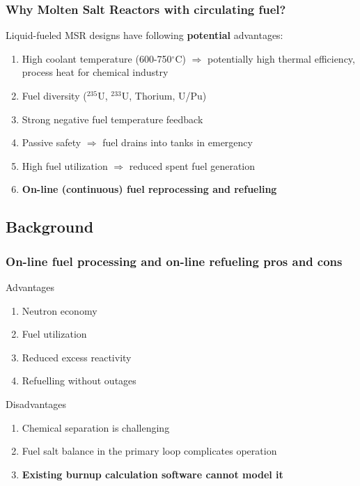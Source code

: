 \begin{frame}
\frametitle{Why Molten Salt Reactors with circulating fuel?}
\begin{block}{Liquid-fueled \gls{MSR} designs have following \textbf{potential} advantages:}
	\begin{enumerate}
		\itemsep1em
		\item High coolant temperature (600-750$^{\circ}$C) 
		$\Rightarrow$ potentially high thermal efficiency, process 
		heat for chemical industry
		\item Fuel diversity ($^{235}$U, $^{233}$U, Thorium, U/Pu)
		\item Strong negative fuel temperature feedback 
		\item Passive safety $\Rightarrow$ fuel drains into tanks 
		in emergency
		\item High fuel utilization $\Rightarrow$ reduced spent fuel 
		generation
		\item<2> \textbf{On-line (continuous) fuel reprocessing and refueling}
	\end{enumerate}
\end{block}

\end{frame}


\subsection{Background}


\begin{frame}
\frametitle{On-line fuel processing and on-line refueling pros and 
cons}
\begin{block}{Advantages}
	\begin{enumerate}
		\item Neutron economy
		\item Fuel utilization
		\item Reduced excess reactivity
		\item Refuelling without outages
	\end{enumerate}
\end{block}

\begin{block}{Disadvantages}
	\begin{enumerate}
		\item Chemical separation is challenging
		\item Fuel salt balance in the primary loop complicates operation
		\item \textbf{Existing burnup calculation software cannot model it}
	\end{enumerate}
\end{block}

\end{frame}


